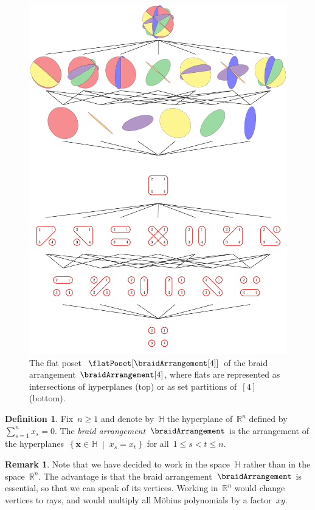 \documentclass{amsart}
\newcommand{\darkblue}{\color{darkblue}} %
\theoremstyle{definition}
\newtheorem{definition}[theorem]{Definition}
\newtheorem{remark}[theorem]{Remark}
\newcommand{\R}{\mathbb{R}} %
\renewcommand{\b}[1]{{\boldsymbol{#1}}} %
\newcommand{\set}[2]{\left\{ #1 \;\middle|\; #2 \right\}} %
\newcommand{\defn}[1]{\textsl{\darkblue #1}} %
\renewcommand{\b}[1]{\boldsymbol{#1}} %
\newcommand{\HH}{\mathbb{H}} %
\begin{document}
\begin{figure}
	\centerline{\includegraphics[scale=.26]{figures/intersectionPosetBraidArrangement4}}
	\caption{The flat poset~$\flatPoset[{\braidArrangement[4]}]$ of the braid arrangement $\braidArrangement[4]$, where flats are represented as intersections of hyperplanes (top) or as set partitions of~$[4]$ (bottom).}
	\label{fig:intersectionPosetBraidArrangement4}
\end{figure}

\begin{definition}
Fix~$n \ge 1$ and denote by~$\HH$ the hyperplane of~$\R^n$ defined by~$\sum_{s = 1}^n x_s = 0$.
The \defn{braid arrangement}~$\braidArrangement$ is the arrangement of the hyperplanes~$\set{\b{x} \in \HH}{x_s = x_t}$ for all~$1 \le s < t \le n$.
\end{definition}

\begin{remark}
\label{rem:essential}
Note that we have decided to work in the space~$\HH$ rather than in the space~$\R^n$.
The advantage is that the braid arrangement~$\braidArrangement$ is essential, so that we can speak of its vertices.
Working in~$\R^n$ would change vertices to rays, and would multiply all M\"obius polynomials by a factor~$xy$.
\end{remark}
\end{document}
